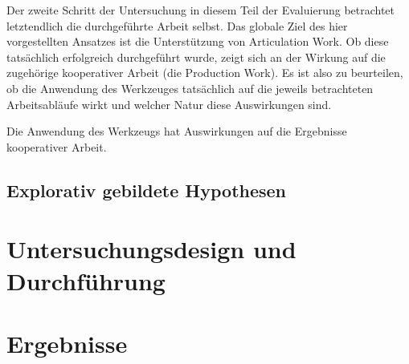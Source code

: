 Der zweite Schritt der Untersuchung in diesem Teil der Evaluierung betrachtet letztendlich die durchgeführte Arbeit selbst. Das globale Ziel des hier vorgestellten Ansatzes ist die Unterstützung von Articulation Work. Ob diese tatsächlich erfolgreich durchgeführt wurde, zeigt sich an der Wirkung auf die zugehörige kooperativer Arbeit (die Production Work). Es ist also zu beurteilen, ob die Anwendung des Werkzeuges tatsächlich auf die jeweils betrachteten Arbeitsabläufe wirkt und welcher Natur diese Auswirkungen sind.

\begin{hyp}
	\label{hyp:wirkung}
	Die Anwendung des Werkzeugs hat Auswirkungen auf die Ergebnisse kooperativer Arbeit.
\end{hyp}


\subsection{Explorativ gebildete Hypothesen} %
\label{sub:a_explorativ_gebildete_hypothesen}



\section{Untersuchungsdesign und Durchführung} %
\label{sec:a_untersuchungsdesign}


\section{Ergebnisse} %
\label{sec:a_ergebnisse}


